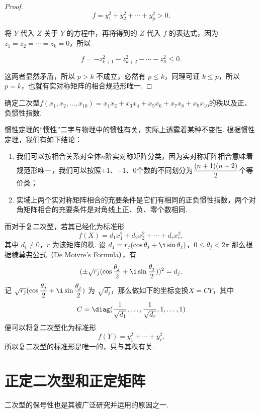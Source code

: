 \begin{proof}
    \[
        f = y_1^2 + y_2^2 + \cdots + y_p^2 > 0.
    \]

    将 $Y$ 代入 $Z$ 关于 $Y$ 的方程中，再将得到的 $Z$ 代入 $f$ 的表达式，因为 $z_1 = z_2 = \cdots = z_k = 0$，所以

    \[
        f = -z_{k + 1}^2 - z_{k + 2}^2 - \cdots - z_n^2 \leqslant 0.
    \]

    这两者显然矛盾，所以 $p > k$ 不成立，必然有 $p \leqslant k$，同理可证 $k \leqslant p$，所以 $p = k$，也就有实对称矩阵的相合规范形唯一.

\end{proof}

\begin{example}{}{}
    确定二次型$f(x_1,x_2,\ldots,x_{10})=x_1x_2+x_3x_4+x_5x_6+x_7x_8+x_9x_{10}$的秩以及正、负惯性指数.
\end{example}

惯性定理的``惯性''二字与物理中的惯性有关，实际上透露着某种不变性. 根据惯性定理，我们有如下结论：
\begin{enumerate}
    \item 我们可以按相合关系对全体$n$阶实对称矩阵分类，因为实对称矩阵相合意味着规范形唯一，我们可以按照$+1$、$-1$、0个数的不同划分为$\vphantom{\cfrac{n+1}{2}}\dfrac{(n+1)(n+2)}{2}$个等价类；

    \item 实域上两个实对称矩阵相合的充要条件是它们有相同的正负惯性指数，两个对角矩阵相合的充要条件是对角线上正、负、零个数相同.
\end{enumerate}

而对于复二次型，若其已经化为标准形
\[
    f(X) = d_1x_1^2 + d_2x_2^2 + \cdots + d_rx_r^2,
\]
其中 $d_i \neq 0$，$r$ 为该矩阵的秩. 设 $d_j = r_j(\cos \theta_j + \i \sin \theta_j)$，$0 \leqslant \theta_j < 2 \pi$ 那么根据棣莫弗公式（De Moivre's Formula），有
\[
    (\pm \sqrt{r_j}(\cos \dfrac{\theta_j}{2} + \i \sin \dfrac{\theta_j}{2}))^2 = d_j.
\]
记 $\sqrt{r_j}(\cos \dfrac{\theta_j}{2} + \i \sin \dfrac{\theta_j}{2})$ 为 $\sqrt{d_j}$，那么做如下的坐标变换$X=CY$，其中
\[C = \diag(\dfrac{1}{\sqrt{d_1}}, \ldots, \dfrac{1}{\sqrt{d_r}}, 1, \ldots, 1)\]
便可以将复二次型化为标准形
\[
    f(Y) = y_1^2 + \cdots + y_r^2.
\]
所以复二次型的标准形是唯一的，只与其秩有关.

\section{正定二次型和正定矩阵}

二次型的保号性也是其被广泛研究并运用的原因之一.

